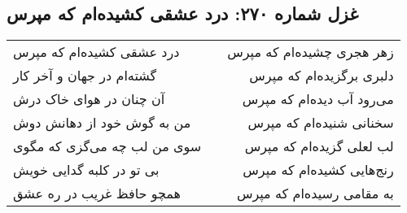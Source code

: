 \begin{center}
\section*{غزل شماره ۲۷۰: درد عشقی کشیده‌ام که مپرس}
\label{sec:sh270}
\begin{longtable}{l p{0.5cm} r}
درد عشقی کشیده‌ام که مپرس
&&
زهر هجری چشیده‌ام که مپرس
\\
گشته‌ام در جهان و آخر کار
&&
دلبری برگزیده‌ام که مپرس
\\
آن چنان در هوای خاک درش
&&
می‌رود آب دیده‌ام که مپرس
\\
من به گوش خود از دهانش دوش
&&
سخنانی شنیده‌ام که مپرس
\\
سوی من لب چه می‌گزی که مگوی
&&
لب لعلی گزیده‌ام که مپرس
\\
بی تو در کلبه گدایی خویش
&&
رنج‌هایی کشیده‌ام که مپرس
\\
همچو حافظ غریب در ره عشق
&&
به مقامی رسیده‌ام که مپرس
\\
\end{longtable}
\end{center}

